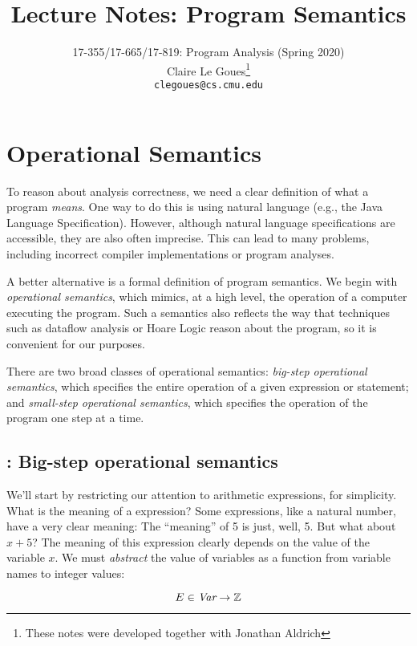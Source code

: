 \documentclass[11pt]{article}
\title{Lecture Notes: Program Semantics}
\author{17-355/17-665/17-819: Program Analysis (Spring 2020)\\
        Claire Le Goues\footnote{These notes were developed together with Jonathan Aldrich}\\
		{\tt clegoues@cs.cmu.edu}}
\date{}
\begin{document}
\maketitle


\section{Operational Semantics} 

To reason about analysis correctness, we need a clear definition of what a
program \textit{means}.  One way to do this is using natural language (e.g., the
Java Language Specification).  However, although natural language specifications
are accessible, they are also often imprecise. This can lead to many problems,
including incorrect compiler implementations or program analyses.

A better alternative is a formal definition of program semantics.  We begin with
\textit{operational semantics}, which mimics, at a high level, the operation of
a computer executing the program.  Such a semantics also reflects the way that
techniques such as dataflow analysis or Hoare Logic reason about the program, so
it is convenient for our purposes.

There are two broad classes of operational semantics: \emph{big-step operational
  semantics}, which specifies the entire operation of a given expression or
statement; and \emph{small-step operational semantics}, which specifies the
operation of the program one step at a time.

\subsection{\WhileLang: Big-step operational semantics}

We'll start by restricting our attention to arithmetic expressions, for
simplicity.  What is the meaning of a \WhileLang expression?  Some expressions, like
a natural number, have a very clear meaning: The ``meaning'' of 5 is just, well,
5.  But what about $x + 5$?  The meaning of this expression clearly depends on
the value of the variable $x$.  We must \emph{abstract} the value of variables
as a function from variable names to integer values:

\begin{equation*}
E \in \textit{Var} \rightarrow \mathbb{Z} 
\end{equation*}

\end{document}
